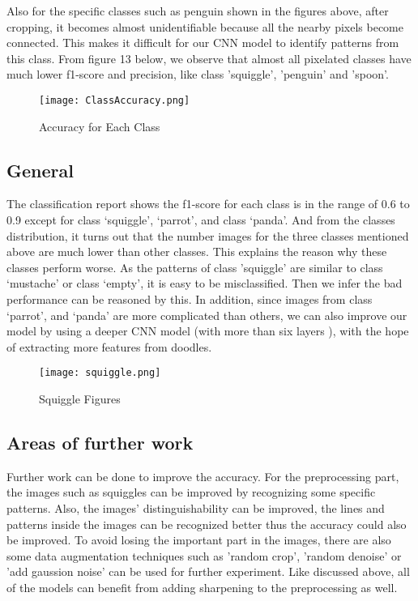 \documentclass[conference]{IEEEtran}
\begin{document}
Also for the specific classes such as penguin shown in the figures above, after cropping, it becomes almost unidentifiable because all the nearby pixels become connected. This makes it difficult for our CNN model to identify patterns from this class. From figure 13 below, we observe that almost all pixelated classes have much lower f1-score and precision, like class 'squiggle', 'penguin' and 'spoon'. 

\begin{figure}[!htbp]
\centering
\texttt{[image: ClassAccuracy.png]}
\caption{Accuracy for Each Class}
\end{figure}

\subsection{General}
The classification report shows the f1-score for each class is in the range of 0.6 to 0.9 except for class ‘squiggle’, ‘parrot’, and class ‘panda’. And from the classes distribution, it turns out that the number images for the three classes mentioned above are much lower than other classes. This explains the reason why these classes perform worse. As the patterns of class 'squiggle' are similar to class ‘mustache’ or class ‘empty’, it is easy to be misclassified. Then we infer the bad performance can be reasoned by this. In addition, since images from class ‘parrot’, and  ‘panda’ are more complicated than others, we can also improve our model by using a deeper CNN model (with more than six layers ), with the hope of extracting more features from doodles.
\begin{figure}[!htbp]
\centering
\texttt{[image: squiggle.png]}
\caption{Squiggle Figures}
\end{figure}

\subsection{Areas of further work}
Further work can be done to improve the accuracy. For the preprocessing part, the images such as squiggles can be improved by recognizing some specific patterns. Also, the images' distinguishability can be improved, the lines and patterns inside the images can be recognized better thus the accuracy could also be improved. To avoid losing the important part in the images, there are also some data augmentation techniques such as 'random crop', 'random denoise' or 'add gaussion noise' can be used for further experiment. Like discussed above, all of the models can benefit from adding sharpening to the preprocessing as well. 
\end{document}
